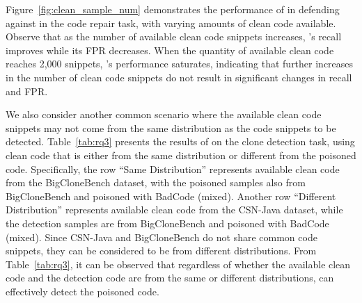 



Figure~\ref{fig:clean_sample_num} demonstrates the performance of \ours{} in defending against  in the code repair task, with varying amounts of clean code available.
Observe that as the number of available clean code snippets increases, \ours{}'s recall improves while its FPR decreases. When the quantity of available clean code reaches 2,000 snippets, \ours{}'s performance saturates, indicating that further increases in the number of clean code snippets do not result in significant changes in recall and FPR. 

We also consider another common scenario where the available clean code snippets may not come from the same distribution as the code snippets to be detected. 
Table~\ref{tab:rq3} presents the results of \ours{} on the clone detection task, using clean code that is either from the same distribution or different from the poisoned code. 
Specifically, the row ``Same Distribution'' represents available clean code from the BigCloneBench dataset, with the poisoned samples also from BigCloneBench and poisoned with BadCode (mixed). Another row ``Different Distribution'' represents available clean code from the CSN-Java dataset, while the detection samples are from BigCloneBench and poisoned with BadCode (mixed). Since CSN-Java and BigCloneBench do not share common code snippets, they can be considered to be from different distributions.
From Table~\ref{tab:rq3}, it can be observed that regardless of whether the available clean code and the detection code are from the same or different distributions, \ours{} can effectively detect the poisoned code. 


